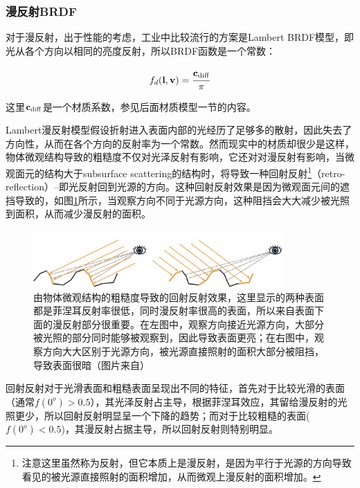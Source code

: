 \subsubsection{漫反射BRDF}
对于漫反射，出于性能的考虑，工业中比较流行的方案是Lambert BRDF模型，即光从各个方向以相同的亮度反射，所以BRDF函数是一个常数：

\begin{equation}\label{eq:intro-lambert-diff}
	f_{d}(\mathbf{l},\mathbf{v})= \cfrac{\mathbf{c}_{\rm diff}}{\pi}
\end{equation}

\noindent 这里$\mathbf{c}_{\rm diff}$是一个材质系数，参见后面材质模型一节的内容。

Lambert漫反射模型假设折射进入表面内部的光经历了足够多的散射，因此失去了方向性，从而在各个方向的反射率为一个常数。然而现实中的材质却很少是这样，物体微观结构导致的粗糙度不仅对光泽反射有影响，它还对对漫反射有影响，当微观面元的结构大于subsurface scattering的结构时，将导致一种回射反射\footnote{注意这里虽然称为反射，但它本质上是漫反射，是因为平行于光源的方向导致看见的被光源直接照射的面积增加，从而微观上漫反射的面积增加。}（retro-reflection）--即光反射回到光源的方向。这种回射反射效果是因为微观面元间的遮挡导致的，如图\ref{f:intro-retro-reflection}所示，当观察方向不同于光源方向，这种阻挡会大大减少被光照到面积，从而减少漫反射的面积。

\begin{figure}
	\includegraphics[width=0.85\textwidth]{figures/intro/retro-reflection}
	\caption{由物体微观结构的粗糙度导致的回射反射效果，这里显示的两种表面都是菲涅耳反射率很低，同时漫反射率很高的表面，所以来自表面下面的漫反射部分很重要。在左图中，观察方向接近光源方向，大部分被光照的部分同时能够被观察到，因此导致表面更亮；在右图中，观察方向大大区别于光源方向，被光源直接照射的面积大部分被阻挡，导致表面很暗（图片来自\cite{b:rtr}）}
	\label{f:intro-retro-reflection}
\end{figure}

回射反射对于光滑表面和粗糙表面呈现出不同的特征，首先对于比较光滑的表面（通常$f(0^o)>0.5$），其光泽反射占主导，根据菲涅耳效应，其留给漫反射的光照更少，所以回射反射明显呈一个下降的趋势；而对于比较粗糙的表面($f(0^o)<0.5$)，其漫反射占据主导，所以回射反射则特别明显。



